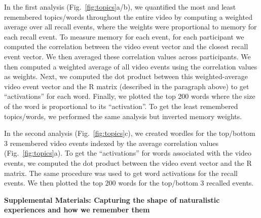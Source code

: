 \documentclass{article}
\begin{document}
In the first analysis (Fig.~\ref{fig:topics}a/b), we quantified the most and least remembered topics/words throughout the entire video by computing a weighted average over all recall events, where the weights were proportional to memory for each recall event. To measure memory for each event, for each participant we computed the correlation between the video event vector and the closest recall event vector. We then averaged these correlation values across participants. We then computed a weighted average of all video events using the correlation values as weights. Next, we computed the dot product between this weighted-average video event vector and the R matrix (described in the paragraph above) to get ``activations'' for each word. Finally, we plotted the top 200 words where the size of the word is proportional to its ``activation''. To get the least remembered topics/words, we performed the same analysis but inverted memory weights.

In the second analysis (Fig.~\ref{fig:topics}c), we created wordles for the top/bottom 3 remembered video events indexed by the average correlation values (Fig.~\ref{fig:topics}a).  To get the ``activations'' for words associated with the video events, we computed the dot product between the video event vector and the R matrix. The same procedure was used to get word activations for the recall events. We then plotted the top 200 words for the top/bottom 3 recalled events.


\pagebreak
\begin{center}
\textbf{\large Supplemental Materials: Capturing the shape of naturalistic experiences and how we remember them}
\end{center}
\setcounter{equation}{0}
\setcounter{figure}{0}
\setcounter{table}{0}
\setcounter{page}{1}
\setcounter{section}{0}
\makeatletter
\renewcommand{\theequation}{S\arabic{equation}}
\renewcommand{\thefigure}{S\arabic{figure}}
\renewcommand{\bibnumfmt}[1]{[S#1]}
\renewcommand{\citenumfont}[1]{S#1}
\end{document}
